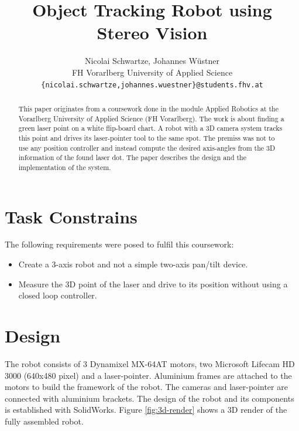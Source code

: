 \documentclass[11pt,twoside,twocolumn,a4paper]{article}
\begin{document}
\title{Object Tracking Robot using Stereo Vision}


\author{Nicolai Schwartze, Johannes Wüstner\\
FH Vorarlberg University of Applied Science\\
{\tt\small \{nicolai.schwartze,johannes.wuestner\}@students.fhv.at}
}


\maketitle
\ifacvrwfinal\thispagestyle{fancy}\fi


\begin{abstract}
This paper originates from a coursework done in the module Applied Robotics at the Vorarlberg University of Applied Science (FH Vorarlberg). The work is about finding a green laser point on a white flip-board chart. A robot with a 3D camera system tracks this point and drives its laser-pointer tool to the same spot. The premiss was not to use any position controller and instead compute the desired axis-angles from the 3D information of the found laser dot. The paper describes the design and the implementation of the system. 
\end{abstract}



\section{Task Constrains}

The following requirements were posed to fulfil this coursework: 
\begin{itemize}
\item Create a 3-axis robot and not a simple two-axis pan/tilt device. 
\item Measure the 3D point of the laser and drive to its position without using a closed loop controller. 
\end{itemize}

\section{Design}

The robot consists of 3 Dynamixel MX-64AT motors, two Microsoft Lifecam HD 3000 (640x480 pixel) and a laser-pointer.
Aluminium frames are attached to the motors to build the framework of the robot. The cameras and laser-pointer are connected with aluminium brackets. The design of the robot and its components is established with SolidWorks.
Figure \ref{fig:3d-render} shows a 3D render of the fully assembled robot.
\end{document}
